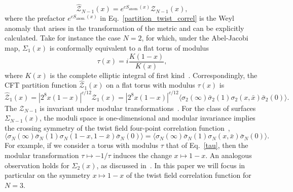 \documentclass[a4paper,11pt]{article}
\begin{document}
\begin{equation}\label{partition_twist_correl}
 \mathcal{\hat{Z}}_{N-1}(x)=e^{cS_{\text{anom.}}(x)} \mathcal{Z}_{N-1}(x),
\end{equation}
where the prefactor $e^{cS_{\text{anom.}}(x)}$ in Eq.~\eqref{partition_twist_correl} is the Weyl anomaly that arises in the 
transformation of the metric and 
can be explicitly calculated. Take for instance the case $N=2$, for which, under the Abel-Jacobi map, $\Sigma_{1}(x)$ is conformally equivalent to a flat torus of modulus 
\begin{equation}\label{tau}
 \tau(x)=i\frac{K(1-x)}{K(x)}, 
\end{equation}
where $K(x)$ is the complete elliptic integral of first 
kind~\cite{Whittaker}. Correspondingly, the CFT partition function $\mathcal{\hat{Z}}_1(x)$ on a flat torus 
with modulus $\tau(x)$ is~\cite{Lunin}
\begin{equation}\label{partition_torus_twist}
 \mathcal{\hat{Z}}_1(x)=|2^8 x(1-x)|^{c/12} \mathcal{Z}_{1}(x)
 =|2^8 x(1-x)|^{c/12} \langle \sigma_2 (\infty)\bar{\sigma}_2(1)\sigma_2(x, \bar{x})\bar{\sigma}_2(0)\rangle.
\end{equation}
The $\mathcal{Z}_{N-1}$ is invariant  
under modular transformations~\cite{CardyMod, Cappelli, Cappelli2}.  For the class of surfaces $\Sigma_{N-1}(x)$, the moduli space is one-dimensional and modular invariance implies the crossing
symmetry of the twist field four-point correlation function~\cite{Cardy},
\begin{equation}\label{cross_symmetry}
 \langle \sigma_N(\infty)\bar{\sigma}_N(1)\sigma_N(1-x, 1-\bar{x})\bar{\sigma}_N(0)\rangle=
 \langle \sigma_N(\infty)\bar{\sigma}_N(1)\sigma_N(x, \bar{x})\bar{\sigma}_N(0)\rangle. 
\end{equation}
For example, if we consider a torus with modulus $\tau$ that of Eq.~\eqref{tau},
then the modular transformation $\tau\mapsto-1/\tau$ induces the change
$x\mapsto 1-x$. An analogous observation holds for $\Sigma_{2}(x)$, as discussed in~\cite{Cardy}.
In this paper  we will focus in particular on 
the symmetry $x\mapsto 1-x$ of the twist field correlation function for $N=3$. 
\end{document}
